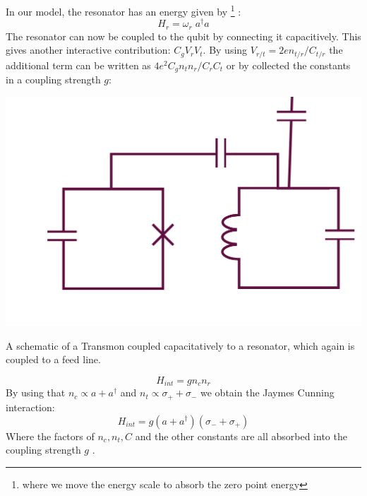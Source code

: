 In our model, the resonator has an energy given by \footnote{where we move the energy scale to absorb the zero point energy} :
\begin{equation}
    H_r = \omega_r \; a^\dagger a
\end{equation}
The resonator can now be coupled to the qubit by connecting it capacitively. This gives another interactive contribution: $C_g V_r V_t$. By using $V_{r/t} = 2e n_{t/r} / C_{t/r}$ the additional term can be written as $4e^2C_g  n_t n_r / C_r C_t$ or by collected the constants in a coupling strength $g$:
\begin{marginfigure}
    \centering
    \includegraphics{Figs/Sections/computations_and_readout/qubit_resonator_feedline.png}
    \caption{A schematic of a Transmon coupled capacitatively to a resonator, which again is coupled to a feed line.}
    \label{fig:schematic_qubit_res}
\end{marginfigure}
\begin{equation}
    H_{int} = g n_c n_r 
\end{equation}
By using that $n_c \propto a + a^\dagger$ and $n_t \propto \sigma_+ + \sigma_-$ we obtain the Jaymes Cunning interaction:
\begin{equation}\label{eq:full_interaction_term}
    H_{int} = g (a + a^\dagger) (\sigma_- + \sigma_+)
\end{equation}
Where the factors of $n_c, n_t, C$ and the other constants are all absorbed into the coupling strength $g$ \cite{krantz_quantum_2019}. 



